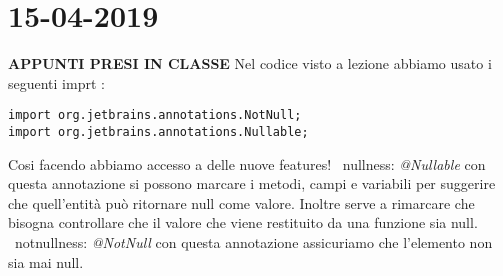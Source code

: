 

\newpage
\section{15-04-2019}
\noindent \textbf{APPUNTI PRESI IN CLASSE} \newline
Nel codice visto a lezione abbiamo usato i seguenti imprt :
\begin{lstlisting}[basicstyle=\small,]
import org.jetbrains.annotations.NotNull;
import org.jetbrains.annotations.Nullable;
\end{lstlisting}
Cosi facendo abbiamo accesso a delle nuove features! \newline
\textbullet\ nullness: \textit{@Nullable} con questa annotazione si possono marcare i metodi, campi e variabili per suggerire che quell'entità può ritornare null come valore. Inoltre serve a rimarcare che bisogna controllare che il valore che viene restituito da una funzione sia null. \newline
\textbullet\ notnullness: \textit{@NotNull} con questa annotazione assicuriamo che l'elemento non sia mai null. \newline

